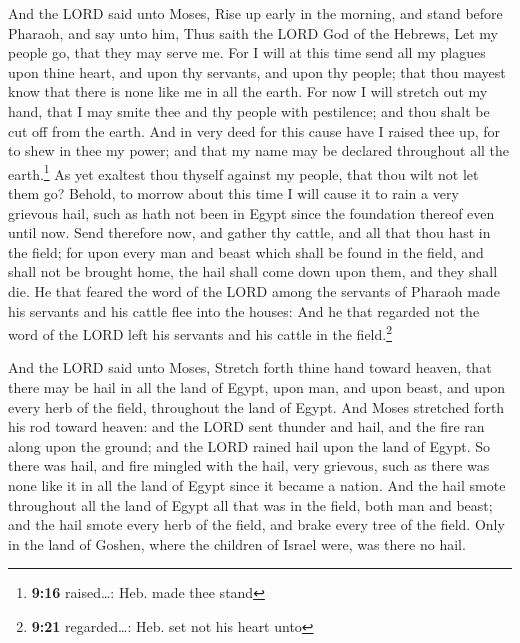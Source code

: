  And the LORD said unto Moses, Rise up early in the
morning, and stand before Pharaoh, and say unto him, Thus saith the LORD
God of the Hebrews, Let my people go, that they may serve me.
 For I will at this time send all my plagues upon thine
heart, and upon thy servants, and upon thy people; that thou mayest know
that there is none like me in all the earth.  For now I
will stretch out my hand, that I may smite thee and thy people with
pestilence; and thou shalt be cut off from the earth. 
And in very deed for this cause have I raised thee up, for to shew in
thee my power; and that my name may be declared throughout all the
earth.\footnote{\textbf{9:16} raised\ldots: Heb. made thee stand}
 As yet exaltest thou thyself against my people, that
thou wilt not let them go?  Behold, to morrow about this
time I will cause it to rain a very grievous hail, such as hath not been
in Egypt since the foundation thereof even until now. 
Send therefore now, and gather thy cattle, and all that thou hast in the
field; for upon every man and beast which shall be found in the field,
and shall not be brought home, the hail shall come down upon them, and
they shall die.  He that feared the word of the LORD
among the servants of Pharaoh made his servants and his cattle flee into
the houses:  And he that regarded not the word of the
LORD left his servants and his cattle in the field.\footnote{\textbf{9:21}
  regarded\ldots: Heb. set not his heart unto}

 And the LORD said unto Moses, Stretch forth thine hand
toward heaven, that there may be hail in all the land of Egypt, upon
man, and upon beast, and upon every herb of the field, throughout the
land of Egypt.  And Moses stretched forth his rod toward
heaven: and the LORD sent thunder and hail, and the fire ran along upon
the ground; and the LORD rained hail upon the land of Egypt.
 So there was hail, and fire mingled with the hail, very
grievous, such as there was none like it in all the land of Egypt since
it became a nation.  And the hail smote throughout all
the land of Egypt all that was in the field, both man and beast; and the
hail smote every herb of the field, and brake every tree of the field.
 Only in the land of Goshen, where the children of Israel
were, was there no hail.

